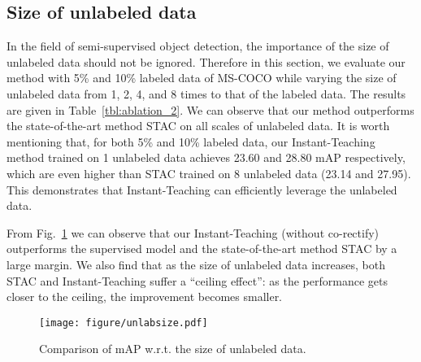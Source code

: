 \documentclass[final]{cvpr}
\begin{document}
 
\subsection{Size of unlabeled data}

In the field of semi-supervised object detection, the importance of the size of unlabeled data should not be ignored. Therefore in this section, we evaluate our method with 5\% and 10\% labeled data of MS-COCO while varying the size of unlabeled data from 1, 2, 4, and 8 times to that of the labeled data. The results are given in Table~\ref{tbl:ablation_2}.
We can observe that our method outperforms the state-of-the-art method STAC on all scales of unlabeled data. It is worth mentioning that, for both 5\% and 10\% labeled data, our Instant-Teaching method trained on 1 unlabeled data achieves 23.60 and 28.80 mAP respectively, which are even higher than STAC trained on 8 unlabeled data (23.14 and 27.95). This demonstrates that Instant-Teaching can efficiently leverage the unlabeled data.

From Fig.~\ref{fig:unlabel_size} we can observe that our Instant-Teaching (without co-rectify) outperforms the supervised model and the state-of-the-art method STAC by a large margin. 
We also find that as the size of unlabeled data increases, both STAC and Instant-Teaching suffer a ``ceiling effect'': as the performance gets closer to the ceiling, the improvement becomes smaller.

\begin{figure}[t!]
	\begin{center}
	\texttt{[image: figure/unlabsize.pdf]}
	\end{center}
	\vspace{-.1in}
	\caption{Comparison of mAP w.r.t. the size of unlabeled data.}
	\label{fig:unlabel_size}
\end{figure}

\begin{table}[t!]
\begin{center}
\end{center}
\vspace{-.1in}
\caption{Comparison of mAP with various values of confidence threshold .}
\vspace{-.1in}
\label{tbl:tau}
\end{table}
\end{document}
